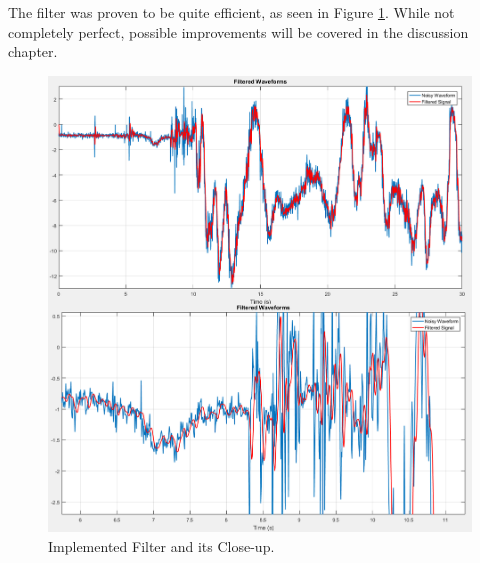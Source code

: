 
\clearpage
The filter was proven to be quite efficient, as seen in Figure \ref{accelFilter}. While not completely perfect, possible improvements will be covered in the discussion chapter.

\begin{figure}[H]
  \centering
    \includegraphics[width=1\textwidth]{images/accelFilter.png}
	\caption{Implemented Filter and its Close-up.}
	\label{accelFilter}
\end{figure}
